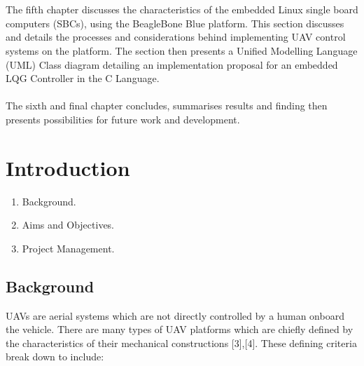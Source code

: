 \documentclass[12pt,a4paper,twoside]{report}
\begin{document}
		\\ \\
		The fifth chapter discusses the characteristics of the embedded Linux single board computers (SBCs), using the BeagleBone Blue platform. This section discusses and details the processes and considerations behind implementing UAV control systems on the platform. The section then presents a Unified Modelling Language (UML) Class diagram detailing an implementation proposal for an embedded LQG Controller in the C Language.
		\\ \\
		The sixth and final chapter concludes, summarises results and finding then presents possibilities for future work and development.
		
	\newpage
	
	\chapter{Introduction}
		
		\begin{enumerate}
			\item
				Background.
			\item 
				Aims and Objectives. 
			\item 
				Project Management.
		\end{enumerate}

		\section{Background}
		
			UAVs are aerial systems which are not directly controlled by a human onboard the vehicle. There are many types of UAV platforms which are chiefly defined by the characteristics of their mechanical constructions [3],[4]. These defining criteria break down to include:
			
\end{document}
